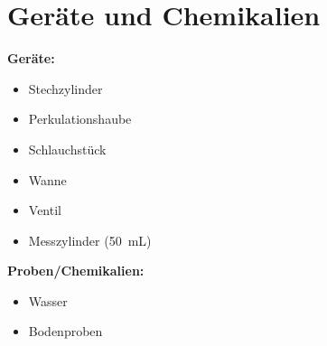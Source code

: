 \chapter{Geräte und Chemikalien}
\label{sec:geraete}

\textbf{Geräte:}
\begin{itemize}
	\item Stechzylinder
	\item Perkulationshaube
	\item Schlauchstück
	\item Wanne
	\item Ventil
	\item Messzylinder (\SI{50}{\milli \liter})
\end{itemize}

\vspace*{5mm}

\textbf{Proben/Chemikalien:}
\begin{itemize}
	\item Wasser
	\item Bodenproben
\end{itemize}





